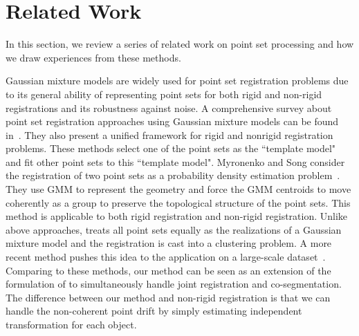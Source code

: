 \section{Related Work}
\label{sec:rw}
In this section, we review a series of related work on point set processing and how we draw experiences from these methods. 

Gaussian mixture models are widely used for point set registration problems due to its general ability of representing point sets for both rigid and non-rigid registrations and its robustness against noise.
%
A comprehensive survey about point set registration approaches using Gaussian mixture models can be found in~\cite{GMM_PAMI}. 
They also present a unified framework for rigid and nonrigid registration problems. 
%
These methods select one of the point sets as the ``template model" and fit other point sets to this ``template model".
%
Myronenko and Song consider the registration of two point sets as a probability density estimation problem~\cite{CPD}.
They use GMM to represent the geometry and force the GMM centroids to move coherently as a group to preserve the topological structure of the point sets. 
This method is applicable to both rigid registration and non-rigid registration. 
%
%
Unlike above approaches, \cite{Evangelidis2014} treats all point sets equally as the realizations of a Gaussian mixture model and the registration is cast into a clustering problem. 
A more recent method pushes this idea to the application on a large-scale dataset~\cite{GOGMA}. 
Comparing to these methods, our method can be seen as an extension of the formulation of \cite{Evangelidis2014} to simultaneously handle joint registration and co-segmentation. The difference between our method and non-rigid registration is that we can handle the non-coherent point drift by simply estimating independent transformation for each object.
% 

